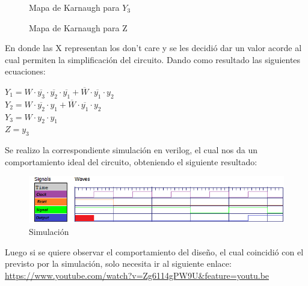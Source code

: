 \begin{center}
	\begin{figure}[h!]
		\begin{minipage}{0.5\textwidth}
			\caption{Mapa de Karnaugh para $Y_3$}
			\centering
			\begin{Karnaugh}
			\end{Karnaugh}
		\end{minipage}
		 \hspace{5mm}
		\begin{minipage}{0.5\textwidth}
			\caption{Mapa de Karnaugh para Z}
			\centering
			\begin{Karnaughvuit}
			\end{Karnaughvuit}
		\end{minipage}
	\end{figure}
\end{center}
En donde las X representan los don't care y se les decidió dar un valor acorde al cual permiten la simplificación del circuito. Dando como resultado las siguientes ecuaciones:\\
\begin{center}
	$Y_1 = W \cdot \overline{ y_3 } \cdot \overline{ y_2} \cdot \overline{ y_1 } + \overline{ W } \cdot \overline{ y_1} \cdot y_2  $\\
	$Y_2 = W \cdot \overline{ y_2} \cdot  y_1  + \overline{ W } \cdot \overline{ y_1} \cdot y_2  $\\
	$Y_3 = W \cdot  y_2 \cdot  y_1   $\\
	$Z = y_3  $\\
\end{center}
Se realizo la correspondiente simulación en verilog, el cual nos da un comportamiento ideal del circuito, obteniendo el siguiente resultado:\\
\FloatBarrier
\begin{figure}[h!]
	\centering
	\includegraphics[scale=0.8]{../Ejercicio-2/Simulacion_Moore.png}
	\caption{Simulación}
\end{figure}
\FloatBarrier
Luego si se quiere observar el comportamiento del diseño, el cual coincidió con el previsto por la simulación, solo necesita ir al siguiente enlace:\\
\url{https://www.youtube.com/watch?v=Zg6114gPW9U&feature=youtu.be}
